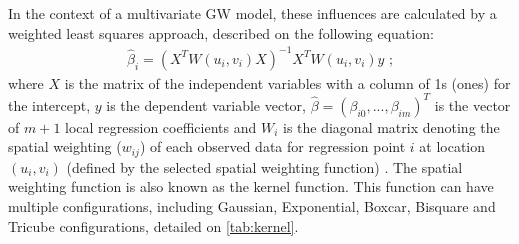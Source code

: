 In the context of a multivariate GW model, these influences are calculated by a weighted least squares approach, described on the following equation: \begin{align}
    \hat{\beta}_i = \left(X^TW\left(u_i,v_i\right)X\right)^{-1}X^TW\left(u_i, v_i \right)y\mbox{ ;}
    \label{eq:wls}
\end{align} where $X$ is the matrix of the independent variables with a column of 1s (ones) for the intercept, $y$ is the dependent variable vector, $\hat{\beta} = \left(\beta_{i0},...,\beta_{im}\right)^T$ is the vector of $m + 1$ local regression coefficients and $W_i$ is the diagonal matrix denoting the spatial weighting ($w_{ij}$) of each observed data for regression point $i$ at location $(u_i, v_i)$ (defined by the selected spatial weighting function) \cite{Gollini2013}. The spatial weighting function is also known as the kernel function. This function can have multiple configurations, including Gaussian, Exponential, Boxcar, Bisquare and Tricube configurations, detailed on \autoref{tab:kernel}.

